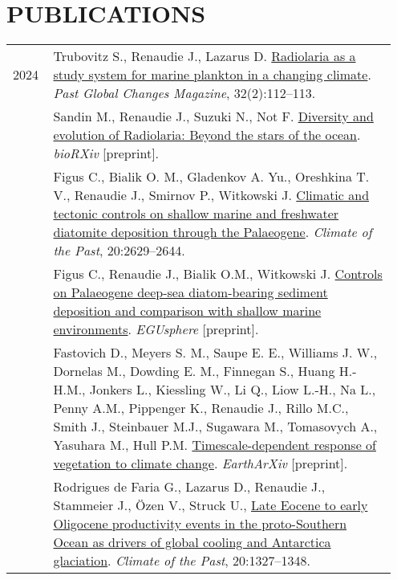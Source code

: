 \documentclass[11pt, a4paper]{article}
\begin{document}
\section{PUBLICATIONS}
\begin{longtable}{@{}p{0.1\linewidth} >{\small}P{0.85\linewidth}@{}}
2024
    & Trubovitz S., Renaudie J., Lazarus D. \href{https://doi.org/10.22498/pages.32.2.112}{Radiolaria as a study system for marine plankton in a changing climate}. \textit{Past Global Changes Magazine}, 32(2):112--113.\\
    & Sandin M., Renaudie J., Suzuki N., Not F. \href{https://www.biorxiv.org/content/10.1101/2024.10.02.614131v1}{Diversity and evolution of Radiolaria: Beyond the stars of the ocean}. \textit{bioRXiv} [preprint].\\
    & Figus C., Bialik O. M., Gladenkov A. Yu., Oreshkina T. V., Renaudie J., Smirnov P., Witkowski J. \href{https://doi.org/10.5194/cp-20-2629-2024}{Climatic and tectonic controls on shallow marine and freshwater diatomite deposition through the Palaeogene}. \textit{Climate of the Past}, 20:2629--2644.\\
    & Figus C., Renaudie J., Bialik O.M., Witkowski J. \href{https://egusphere.copernicus.org/preprints/2024/egusphere-2024-3768/}{Controls on Palaeogene deep-sea diatom-bearing sediment deposition and comparison with shallow marine environments}. \textit{EGUsphere} [preprint].\\
    & Fastovich D., Meyers S. M., Saupe E. E., Williams J. W., Dornelas M., Dowding E. M., Finnegan S., Huang H.-H.M., Jonkers L., Kiessling W., Li Q., Liow L.-H., Na L., Penny A.M., Pippenger K., Renaudie J., Rillo M.C., Smith J., Steinbauer M.J., Sugawara M., Tomasovych A., Yasuhara M., Hull P.M. \href{https://doi.org/10.31223/X5S98P}{Timescale-dependent response of vegetation to climate change}. \textit{EarthArXiv} [preprint].\\
    & Rodrigues de Faria G., Lazarus D., Renaudie J., Stammeier J., Özen V., Struck U., \href{https://doi.org/10.5194/cp-20-1327-2024}{Late Eocene to early Oligocene productivity events in the proto-Southern Ocean as drivers of global cooling and Antarctica glaciation}. \textit{Climate of the Past}, 20:1327--1348.\\

\end{longtable}
\end{document}
